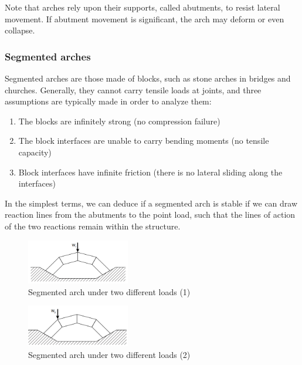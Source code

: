 \documentclass{article}
\begin{document}
Note that arches rely upon their supports, called abutments, to resist lateral movement. If abutment movement is significant, the arch may deform or even collapse.

\subsubsection{Segmented arches}

Segmented arches are those made of blocks, such as stone arches in bridges and churches. Generally, they cannot carry tensile loads at joints, and three assumptions are typically made in order to analyze them:

\begin{enumerate}
    \item The blocks are infinitely strong (no compression failure)
    \item The block interfaces are unable to carry bending moments (no tensile capacity)
    \item Block interfaces have infinite friction (there is no lateral sliding along the interfaces)
\end{enumerate}

In the simplest terms, we can deduce if a segmented arch is stable if we can draw reaction lines from the abutments to the point load, such that the lines of action of the two reactions remain within the structure.

\begin{figure}[h]
    \centering
    \includegraphics[width = 0.4\textwidth]{images/segarch1.png}
    \caption{Segmented arch under two different loads (1)}
    \label{fig:enter-label}
\end{figure}

\begin{figure}[h]
    \centering
    \includegraphics[width = 0.4\textwidth]{images/segarch2.png}
    \caption{Segmented arch under two different loads (2)}
    \label{fig:enter-label}
\end{figure}
\end{document}

